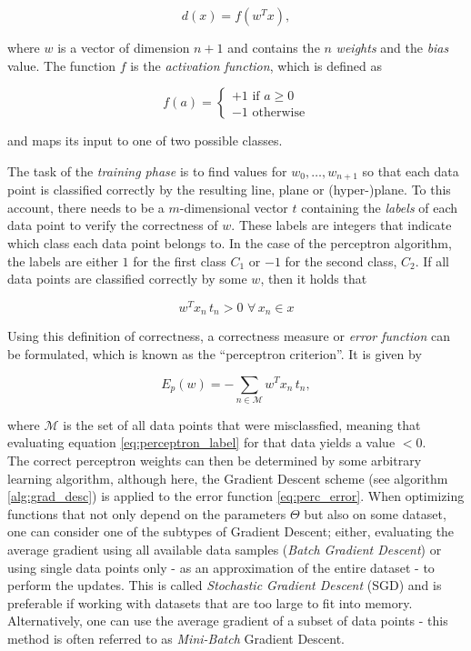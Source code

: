 \[ d(x) = f(w^{T}x), \]

\noindent where $w$ is a vector of dimension $n+1$ and contains the $n$ \textit{weights} and the \textit{bias} value. The function $f$ is the \textit{activation function}, which is defined as 

\[ f(a) =  \begin{cases}
		+1 \text{ if } a \geq 0 \\
	   	 -1 \text{ otherwise}
	    \end{cases}\]

\noindent and maps its input to one of two possible classes.

The task of the \textit{training phase} is to find values for $w_0, \dots, w_{n+1}$ so that each data point is classified correctly by the resulting line, plane or (hyper-)plane. To this account, there needs to be a $m$-dimensional vector $t$ containing the \textit{labels} of each data point to verify the correctness of $w$. These labels are integers that indicate which class each data point belongs to. In the case of the perceptron algorithm, the labels are either $1$ for the first class $C_1$ or $-1$ for the second class, $C_2$. If all data points are classified correctly by some $w$, then it holds that

\[ w^T x_n \, t_n > 0 \,\,\forall\, x_n \in x \label{eq:perceptron_label} \]

\noindent Using this definition of correctness, a correctness measure or \textit{error function} can be formulated, which is known as the ``perceptron criterion''. It is given by

\[ E_p(w) = - \sum \limits_{n \in \mathcal{M}} w^T x_n\, t_n, \label{eq:perc_error}\]

\noindent where $\mathcal{M}$ is the set of all data points that were misclassfied, meaning that evaluating equation \ref{eq:perceptron_label} for that data yields a value $< 0$. \cite[pp. 192--194]{bishop_pattern}\\

\noindent The correct perceptron weights can then be determined by some arbitrary learning algorithm, although here, the Gradient Descent scheme (see algorithm \ref{alg:grad_desc}) is applied to the error function \ref{eq:perc_error}. When optimizing functions that not only depend on the parameters $\Theta$ but also on some dataset, one can consider one of the subtypes of Gradient Descent; either, evaluating the average gradient using all available data samples (\textit{Batch Gradient Descent}) or using single data points only - as an approximation of the entire dataset - to perform the updates. This is called \textit{Stochastic Gradient Descent} (SGD) and is preferable if working with datasets that are too large to fit into memory. Alternatively, one can use the average gradient of a subset of data points - this method is often referred to as \textit{Mini-Batch} Gradient Descent.

